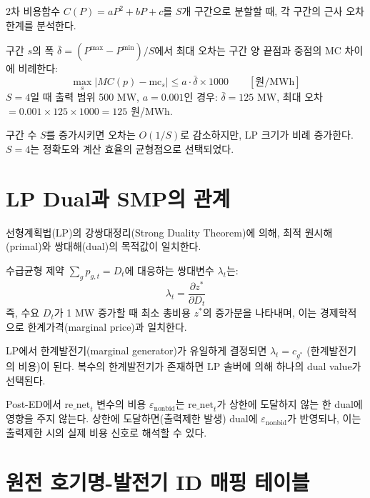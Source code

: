 \documentclass[11pt, a4paper]{article}
\begin{document}
2차 비용함수 $C(P) = aP^2 + bP + c$를 $S$개 구간으로 분할할 때,
각 구간의 근사 오차 한계를 분석한다.

구간 $s$의 폭 $\bar{\delta} = (P^{\max} - P^{\min})/S$에서
최대 오차는 구간 양 끝점과 중점의 MC 차이에 비례한다:
\begin{equation}
    \max_s |MC(p) - \text{mc}_s| \leq a \cdot \bar{\delta} \times 1000 \qquad [\text{원/MWh}]
\end{equation}
$S = 4$일 때 출력 범위 500 MW, $a = 0.001$인 경우:
$\bar{\delta} = 125$ MW, 최대 오차 $= 0.001 \times 125 \times 1000 = 125$ 원/MWh.

구간 수 $S$를 증가시키면 오차는 $O(1/S)$로 감소하지만, LP 크기가 비례 증가한다.
$S=4$는 정확도와 계산 효율의 균형점으로 선택되었다.


\section{LP Dual과 SMP의 관계}\label{app:dual_smp}

선형계획법(LP)의 강쌍대정리(Strong Duality Theorem)에 의해,
최적 원시해(primal)와 쌍대해(dual)의 목적값이 일치한다.

수급균형 제약 $\sum_g p_{g,t} = D_t$에 대응하는 쌍대변수 $\lambda_t$는:
\begin{equation}
    \lambda_t = \frac{\partial z^*}{\partial D_t}
\end{equation}
즉, 수요 $D_t$가 1 MW 증가할 때 최소 총비용 $z^*$의 증가분을 나타내며,
이는 경제학적으로 한계가격(marginal price)과 일치한다.

LP에서 한계발전기(marginal generator)가 유일하게 결정되면
$\lambda_t = c_{g^*}$ (한계발전기의 비용)이 된다.
복수의 한계발전기가 존재하면 LP 솔버에 의해 하나의 dual value가 선택된다.

Post-ED에서 $\text{re\_net}_t$ 변수의 비용 $\varepsilon_{\text{nonbid}}$는
$\text{re\_net}_t$가 상한에 도달하지 않는 한 dual에 영향을 주지 않는다.
상한에 도달하면(출력제한 발생) dual에 $\varepsilon_{\text{nonbid}}$가 반영되나,
이는 출력제한 시의 실제 비용 신호로 해석할 수 있다.


\section{원전 호기명-발전기 ID 매핑 테이블}\label{app:nuclear_map}
\end{document}
